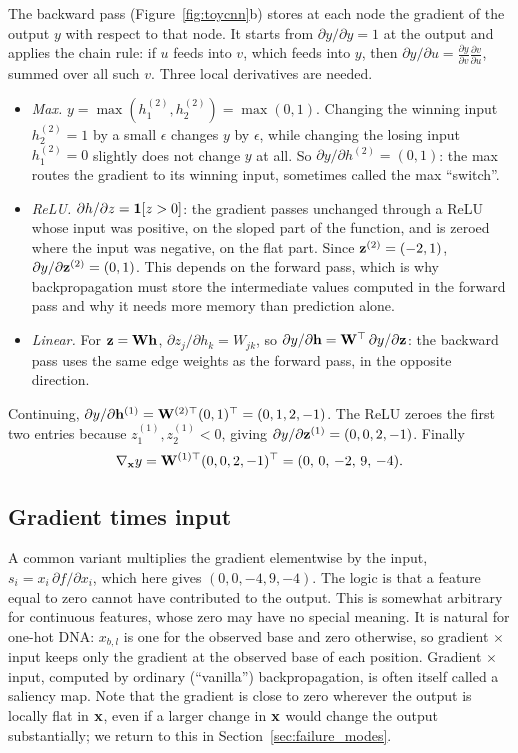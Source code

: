 The backward pass (Figure~\ref{fig:toycnn}b) stores at each node the gradient of the output $y$ with respect to that node. It starts from $\partial y/\partial y=1$ at the output and applies the chain rule: if $u$ feeds into $v$, which feeds into $y$, then $\partial y/\partial u=\frac{\partial y}{\partial v}\frac{\partial v}{\partial u}$, summed over all such $v$. Three local derivatives are needed.
\begin{itemize}
  \item \emph{Max.} $y=\max(h_1^{(2)},h_2^{(2)})=\max(0,1)$. Changing the winning input $h^{(2)}_2=1$ by a small $\epsilon$ changes $y$ by $\epsilon$, while changing the losing input $h^{(2)}_1=0$ slightly does not change $y$ at all. So $\partial y/\partial h^{(2)}=(0,1)$: the max routes the gradient to its winning input, sometimes called the max ``switch''.
  \item \emph{ReLU.} $\partial h/\partial z=\mathbf{1}[z>0]$: the gradient passes unchanged through a ReLU whose input was positive, on the sloped part of the function, and is zeroed where the input was negative, on the flat part. Since $\mathbf{z}^{(2)}=(-2,1)$, $\partial y/\partial\mathbf{z}^{(2)}=(0,1)$. This depends on the forward pass, which is why backpropagation must store the intermediate values computed in the forward pass and why it needs more memory than prediction alone.
  \item \emph{Linear.} For $\mathbf{z}=\mathbf{W}\mathbf{h}$, $\partial z_j/\partial h_k=W_{jk}$, so $\partial y/\partial\mathbf{h}=\mathbf{W}^\top\,\partial y/\partial\mathbf{z}$: the backward pass uses the same edge weights as the forward pass, in the opposite direction.
\end{itemize}
Continuing, $\partial y/\partial\mathbf{h}^{(1)}=\mathbf{W}^{(2)\top}(0,1)^\top=(0,1,2,-1)$. The ReLU zeroes the first two entries because $z^{(1)}_1,z^{(1)}_2<0$, giving $\partial y/\partial\mathbf{z}^{(1)}=(0,0,2,-1)$. Finally
\begin{equation}
  \nabla_{\mathbf{x}}y = \mathbf{W}^{(1)\top}(0,0,2,-1)^\top = (0,\,0,\,-2,\,9,\,-4).
\end{equation}

\subsection{Gradient times input}

A common variant multiplies the gradient elementwise by the input, $s_i=x_i\,\partial f/\partial x_i$, which here gives $(0,0,-4,9,-4)$. The logic is that a feature equal to zero cannot have contributed to the output. This is somewhat arbitrary for continuous features, whose zero may have no special meaning. It is natural for one-hot DNA: $x_{b,l}$ is one for the observed base and zero otherwise, so gradient $\times$ input keeps only the gradient at the observed base of each position. Gradient $\times$ input, computed by ordinary (``vanilla'') backpropagation, is often itself called a saliency map. Note that the gradient is close to zero wherever the output is locally flat in $\mathbf{x}$, even if a larger change in $\mathbf{x}$ would change the output substantially; we return to this in Section~\ref{sec:failure_modes}.

